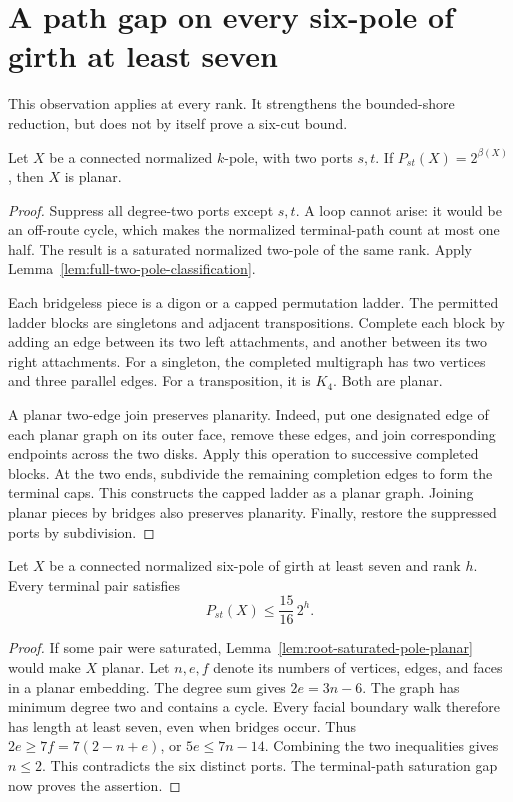 \section{A path gap on every six-pole of girth at least seven}
\label{sec:root-six-planarity}

This observation applies at every rank.
It strengthens the bounded-shore reduction, but does not by itself prove a six-cut bound.

\begin{lemma}
\label{lem:root-saturated-pole-planar}
Let $X$ be a connected normalized $k$-pole, with two ports $s,t$.
If $P_{st}(X)=2^{\beta(X)}$, then $X$ is planar.
\end{lemma}

\begin{proof}
Suppress all degree-two ports except $s,t$.
A loop cannot arise: it would be an off-route cycle, which makes the normalized terminal-path count at most one half.
The result is a saturated normalized two-pole of the same rank.
Apply Lemma~\ref{lem:full-two-pole-classification}.

Each bridgeless piece is a digon or a capped permutation ladder.
The permitted ladder blocks are singletons and adjacent transpositions.
Complete each block by adding an edge between its two left attachments, and another between its two right attachments.
For a singleton, the completed multigraph has two vertices and three parallel edges.
For a transposition, it is $K_4$.
Both are planar.

A planar two-edge join preserves planarity.
Indeed, put one designated edge of each planar graph on its outer face, remove these edges, and join corresponding endpoints across the two disks.
Apply this operation to successive completed blocks.
At the two ends, subdivide the remaining completion edges to form the terminal caps.
This constructs the capped ladder as a planar graph.
Joining planar pieces by bridges also preserves planarity.
Finally, restore the suppressed ports by subdivision.
\end{proof}

\begin{proposition}
\label{prop:root-six-girth-path-gap}
Let $X$ be a connected normalized six-pole of girth at least seven and rank $h$.
Every terminal pair satisfies
\[
 P_{st}(X)\le\frac{15}{16}\,2^h.
\]
\end{proposition}

\begin{proof}
If some pair were saturated, Lemma~\ref{lem:root-saturated-pole-planar} would make $X$ planar.
Let $n,e,f$ denote its numbers of vertices, edges, and faces in a planar embedding.
The degree sum gives $2e=3n-6$.
The graph has minimum degree two and contains a cycle.
Every facial boundary walk therefore has length at least seven, even when bridges occur.
Thus $2e\ge7f=7(2-n+e)$, or $5e\le7n-14$.
Combining the two inequalities gives $n\le2$.
This contradicts the six distinct ports.
The terminal-path saturation gap now proves the assertion.
\end{proof}

